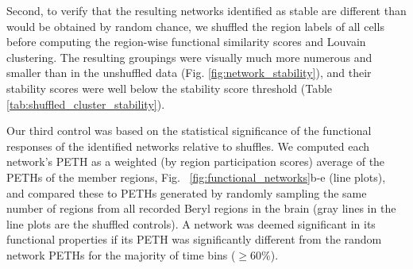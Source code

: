 Second, to verify that the resulting networks identified as stable are different than would be obtained by random chance, we shuffled the region labels of all cells before computing the region-wise functional similarity scores and Louvain clustering. 
The resulting groupings were visually much more numerous and smaller than in the unshuffled data (Fig. \ref{fig:network_stability}), and their stability scores were well below the stability score threshold (Table \ref{tab:shuffled_cluster_stability}).

Our third control was based on the statistical significance of the functional responses of the identified networks relative to shuffles. We computed each network's PETH as a weighted (by region participation scores) average of the PETHs of the member regions, Fig. ~\ref{fig:functional_networks}b-e (line plots), and compared these to PETHs generated by randomly sampling the same number of regions from all recorded Beryl regions in the brain (gray lines in the line plots are the shuffled controls). A network was deemed significant in its functional properties if its PETH was significantly different from the random network PETHs for the majority of time bins ($\geq60\%$). 

